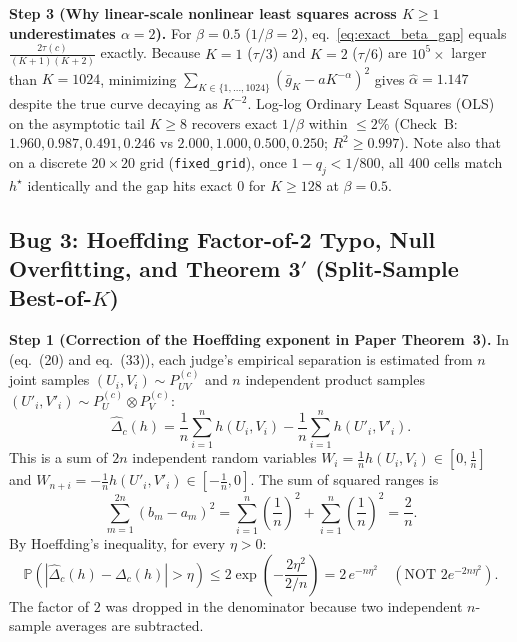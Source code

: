 \documentclass[11pt]{article}
\newcommand{\Prob}{\mathbb{P}}
\begin{document}
\textbf{Step 3 (Why linear-scale nonlinear least squares across $K \ge 1$ underestimates $\alpha = 2$).}
For $\beta = 0.5$ ($1/\beta = 2$), eq.~\eqref{eq:exact_beta_gap} equals $\frac{2\tau(c)}{(K+1)(K+2)}$ exactly. Because $K=1$ ($\tau/3$) and $K=2$ ($\tau/6$) are $10^5\times$ larger than $K=1024$, minimizing $\sum_{K \in \{1,\dots,1024\}} (\bar{g}_K - a K^{-\alpha})^2$ gives $\hat{\alpha} = 1.147$ despite the true curve decaying as $K^{-2}$. Log-log Ordinary Least Squares (OLS) on the asymptotic tail $K \ge 8$ recovers exact $1/\beta$ within $\le 2\%$ (Check~B: $1.960, 0.987, 0.491, 0.246$ vs $2.000, 1.000, 0.500, 0.250$; $R^2 \ge 0.997$). Note also that on a discrete $20 \times 20$ grid (\texttt{fixed\_grid}), once $1 - q_j < 1/800$, all 400 cells match $h^\star$ identically and the gap hits exact $0$ for $K \ge 128$ at $\beta = 0.5$.

\subsection{\texorpdfstring{Bug 3: Hoeffding Factor-of-2 Typo, Null Overfitting, and Theorem 3$'$ (Split-Sample Best-of-$K$)}{Null overfitting and split-sample critic selection}}
\label{sec:hoeffding_split}

\textbf{Step 1 (Correction of the Hoeffding exponent in Paper Theorem~3).}
In  (eq.~(20) and eq.~(33)), each judge's empirical separation is estimated from $n$ joint samples $(U_i,V_i) \sim P^{(c)}_{UV}$ and $n$ independent product samples $(U'_i, V'_i) \sim P^{(c)}_U \otimes P^{(c)}_V$:
\begin{equation}
\widehat{\Delta}_c(h) = \frac{1}{n}\sum_{i=1}^n h(U_i, V_i) - \frac{1}{n}\sum_{i=1}^n h(U'_i, V'_i).
\end{equation}
This is a sum of $2n$ independent random variables $W_i = \tfrac{1}{n}h(U_i,V_i) \in [0, \tfrac{1}{n}]$ and $W_{n+i} = -\tfrac{1}{n}h(U'_i,V'_i) \in [-\tfrac{1}{n}, 0]$. The sum of squared ranges is
\begin{equation}
\sum_{m=1}^{2n} (b_m - a_m)^2 = \sum_{i=1}^n \left(\frac{1}{n}\right)^2 + \sum_{i=1}^n \left(\frac{1}{n}\right)^2 = \frac{2}{n}.
\end{equation}
By Hoeffding's inequality, for every $\eta > 0$:
\begin{equation}
\label{eq:hoeffding_corr}
\Prob\!\left(\left|\widehat{\Delta}_c(h) - \Delta_c(h)\right| > \eta\right)
\le 2\exp\!\left(-\frac{2\eta^2}{2/n}\right)
= \boxed{2\,e^{-n\eta^2}} \quad (\text{NOT } 2e^{-2n\eta^2}).
\end{equation}
The factor of $2$ was dropped in the denominator because two independent $n$-sample averages are subtracted.
\end{document}
